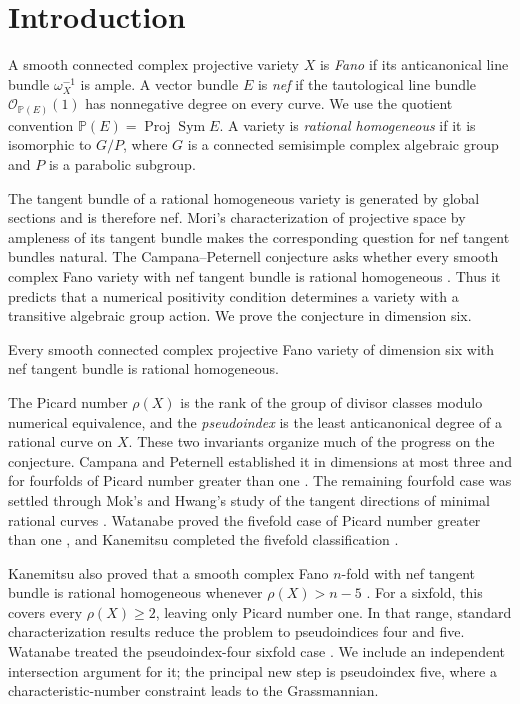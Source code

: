 \section{Introduction}

A smooth connected complex projective variety $X$ is \emph{Fano} if
its anticanonical line bundle $\omega_X^{-1}$ is ample. A vector bundle
$E$ is \emph{nef} if the tautological line bundle
$\mathcal O_{\mathbb P(E)}(1)$ has nonnegative degree on every curve.
We use the quotient convention
$\mathbb P(E)=\operatorname{Proj}\operatorname{Sym}E$.
A variety is \emph{rational homogeneous} if it is isomorphic to $G/P$,
where $G$ is a connected semisimple complex algebraic group and $P$ is
a parabolic subgroup.

The tangent bundle of a rational homogeneous variety is generated by
global sections and is therefore nef. Mori's characterization of
projective space by ampleness of its tangent bundle
\cite{Mori1979} makes the corresponding question for nef tangent
bundles natural. The Campana--Peternell conjecture asks whether every
smooth complex Fano variety with nef tangent bundle is rational
homogeneous \cite{CampanaPeternell1991}. Thus it predicts that a
numerical positivity condition determines a variety with a transitive
algebraic group action. We prove the conjecture in dimension six.

\begin{theorem}\label{thm:main}
Every smooth connected complex projective Fano variety of dimension six
with nef tangent bundle is rational homogeneous.
\end{theorem}

The Picard number $\rho(X)$ is the rank of the group of divisor classes
modulo numerical equivalence, and the \emph{pseudoindex} is the least
anticanonical degree of a rational curve on $X$.
These two invariants organize much of the progress on the conjecture.
Campana and Peternell established it in dimensions at most three and
for fourfolds of Picard number greater than one
\cite{CampanaPeternell1991,CampanaPeternell1993}.
The remaining fourfold case was settled through Mok's and Hwang's
study of the tangent directions of minimal rational curves
\cite{Mok2002,Hwang2006}. Watanabe proved the fivefold case of Picard
number greater than one \cite[Theorem~1.2]{Watanabe2014}, and
Kanemitsu completed the fivefold classification
\cite[Theorem~0.2]{Kanemitsu2017}.

Kanemitsu also proved that a smooth complex Fano $n$-fold with nef
tangent bundle is rational homogeneous whenever $\rho(X)>n-5$
\cite[Theorem~0.2]{Kanemitsu2016}. For a sixfold, this covers every
$\rho(X)\geq2$, leaving only Picard number one. In that range,
standard characterization results reduce the problem to pseudoindices
four and five. Watanabe treated the pseudoindex-four sixfold case
\cite[Theorem~2.4]{Watanabe2021}. We include an independent intersection
argument for it; the principal new step is pseudoindex five, where a
characteristic-number constraint leads to the Grassmannian.

